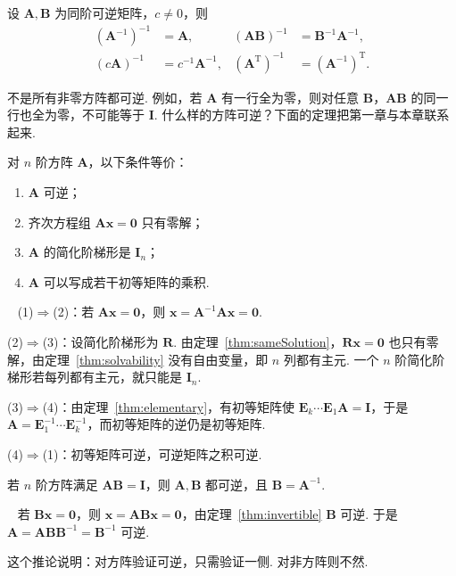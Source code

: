 \documentclass[lang=cn,10.5pt,scheme=chinese,toc=twocol,section,chinesefont=nofont,
twoside,citestyle=gb7714-2015,bibstyle=gb7714-2015]{elegantbook}
\newcommand{\vv}[1]{\boldsymbol{#1}}
\newcommand{\zero}{\boldsymbol{0}}          %
\newcommand{\trans}{\mathrm{T}}             %
\numberwithin{equation}{section}   %
\newcommand*{\lnlabel}[1]{{\sffamily\bfseries\color{black}#1}}
\renewenvironment{proof}{%
	\par\noindent\lnlabel{\proofname}\;\ \color{black!90}\cfs}{\par}
\begin{document}
设 $\vv A,\vv B$ 为同阶可逆矩阵，$c\ne0$，则
\[
  \begin{aligned}
    (\vv{A}^{-1})^{-1} & =\vv{A},             & (\vv{AB})^{-1}       & =\vv{B}^{-1}\vv{A}^{-1}, \\
    (c \vv{A})^{-1}    & =c^{-1} \vv{A}^{-1}, & (\vv{A}^\trans)^{-1} & =(\vv{A}^{-1})^\trans.
  \end{aligned}
\]

不是所有非零方阵都可逆. 例如，若 $\vv A$ 有一行全为零，则对任意 $\vv B$，$\vv{AB}$ 的同一行也全为零，不可能等于 $\vv I$. 什么样的方阵可逆？下面的定理把第一章与本章联系起来.

\begin{theorem}
  \label{thm:invertible}
  对 $n$ 阶方阵 $\vv A$，以下条件等价：
  \begin{enumerate}
    \item $\vv A$ 可逆；
    \item 齐次方程组 $\vv{Ax}=\zero$ 只有零解；
    \item $\vv A$ 的简化阶梯形是 $\vv I_n$；
    \item $\vv A$ 可以写成若干初等矩阵的乘积.
  \end{enumerate}
\end{theorem}
\begin{proof}
  (1)$\Rightarrow$(2)：若 $\vv{Ax}=\zero$，则 $\vv x=\vv A^{-1}\vv{Ax}=\zero$.

  (2)$\Rightarrow$(3)：设简化阶梯形为 $\vv R$. 由定理~\ref{thm:sameSolution}，$\vv{Rx}=\zero$ 也只有零解，由定理~\ref{thm:solvability} 没有自由变量，即 $n$ 列都有主元. 一个 $n$ 阶简化阶梯形若每列都有主元，就只能是 $\vv I_n$.

  (3)$\Rightarrow$(4)：由定理~\ref{thm:elementary}，有初等矩阵使 $\vv E_k\cdots\vv E_1\vv A=\vv I$，于是 $\vv A=\vv E_1^{-1}\cdots\vv E_k^{-1}$，而初等矩阵的逆仍是初等矩阵.

  (4)$\Rightarrow$(1)：初等矩阵可逆，可逆矩阵之积可逆.
\end{proof}

\begin{corollary}
  \label{cor:onesided}
  若 $n$ 阶方阵满足 $\vv{AB}=\vv I$，则 $\vv A,\vv B$ 都可逆，且 $\vv B=\vv A^{-1}$.
\end{corollary}
\begin{proof}
  若 $\vv{Bx}=\zero$，则 $\vv x=\vv{ABx}=\zero$，由定理~\ref{thm:invertible} $\vv B$ 可逆. 于是 $\vv A=\vv A\vv B\vv B^{-1}=\vv B^{-1}$ 可逆.
\end{proof}

这个推论说明：对方阵验证可逆，只需验证一侧. 对非方阵则不然.
\end{document}
